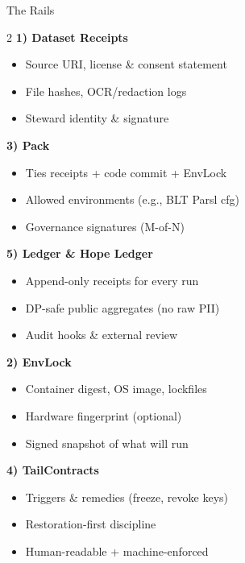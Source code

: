 \documentclass[11pt]{article}
\begin{document}
\begin{panelC}{The Rails}
	\begin{multicols}{2}
		\textbf{1) Dataset Receipts}\\[-4pt]
		\begin{itemize}
			\item Source URI, license \& consent statement
			\item File hashes, OCR/redaction logs
			\item Steward identity \& signature
		\end{itemize}
		
		\textbf{3) Pack}\\[-4pt]
		\begin{itemize}
			\item Ties receipts + code commit + EnvLock
			\item Allowed environments (e.g., BLT Parsl cfg)
			\item Governance signatures (M-of-N)
		\end{itemize}
		
		\textbf{5) Ledger \& Hope Ledger}\\[-4pt]
		\begin{itemize}
			\item Append-only receipts for every run
			\item DP-safe public aggregates (no raw PII)
			\item Audit hooks \& external review
		\end{itemize}
		
		\columnbreak
		
		\textbf{2) EnvLock}\\[-4pt]
		\begin{itemize}
			\item Container digest, OS image, lockfiles
			\item Hardware fingerprint (optional)
			\item Signed snapshot of what will run
		\end{itemize}
		
		\textbf{4) TailContracts}\\[-4pt]
		\begin{itemize}
			\item Triggers \& remedies (freeze, revoke keys)
			\item Restoration-first discipline
			\item Human-readable + machine-enforced
		\end{itemize}
	\end{multicols}
\end{panelC}
\end{document}
